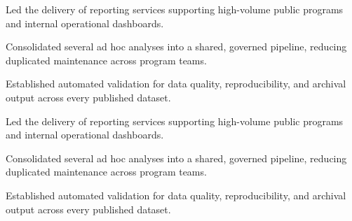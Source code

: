 \documentclass[fontsize=11pt, margin=narrow, medium=print]{careerdossier-resume}
\begin{document}
\begin{CDossierEntry}[title = {Analytics Engineer}, organization = {Regional Data Cooperative}, location = {Kitchener, ON}, dates = {2016--2018}]
  \begin{CDossierItemize}
    \item Led the delivery of reporting services supporting high-volume public programs and internal operational dashboards.
    \item Consolidated several ad hoc analyses into a shared, governed pipeline, reducing duplicated maintenance across program teams.
    \item Established automated validation for data quality, reproducibility, and archival output across every published dataset.
  \end{CDossierItemize}
\end{CDossierEntry}
\begin{CDossierEntry}[title = {Junior Analyst}, organization = {Lakeshore Analytics Group}, location = {Hamilton, ON}, dates = {2014--2016}]
  \begin{CDossierItemize}
    \item Led the delivery of reporting services supporting high-volume public programs and internal operational dashboards.
    \item Consolidated several ad hoc analyses into a shared, governed pipeline, reducing duplicated maintenance across program teams.
    \item Established automated validation for data quality, reproducibility, and archival output across every published dataset.
  \end{CDossierItemize}
\end{CDossierEntry}

\begin{CDossierEntry}[title = {Ph.D. in Computer Science}, organization = {University of Toronto}, location = {Toronto, ON}, dates = {2021--2026}]
\end{CDossierEntry}
\begin{CDossierEntry}[title = {M.Sc. in Software Engineering}, organization = {McGill University}, location = {Montréal, QC}, dates = {2019--2021}]
\end{CDossierEntry}
\begin{CDossierEntry}[title = {B.A.Sc. in Computer Engineering, Honours}, organization = {University of Waterloo}, location = {Waterloo, ON}, dates = {2014--2019}]
\end{CDossierEntry}
\end{document}
